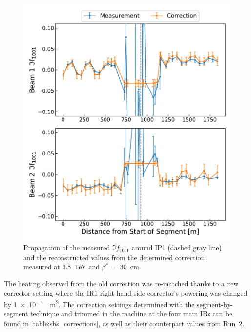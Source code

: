 \begin{figure}[!htb]
    \centering
    \includegraphics*[width=\textwidth]{Figures/IR_Coupling_Correction/commissioning_sbs_imag_f1001_ip1.pdf}
    \caption{Propagation of the measured \(\Im f_{1001}\) around IP\num{1} (dashed gray line) and the reconstructed values from the determined correction, measured at \qty{6.8}{\tera\electronvolt} and \(\beta^{*}=\) \qty{30}{\centi\meter}.}
    \label{figure:commissioning_sbs_imag_f1001_ip1}
\end{figure}

The beating observed from the old correction was re-matched thanks to a new corrector setting where the IR\num{1} right-hand side corrector's powering was changed by \qty{1e-4}{\per\square\meter}.
The correction settings determined with the segment-by-segment technique and trimmed in the machine at the four main IRs can be found in \cref{table:sbs_corrections}, as well as their counterpart values from Run~\num{2}.

